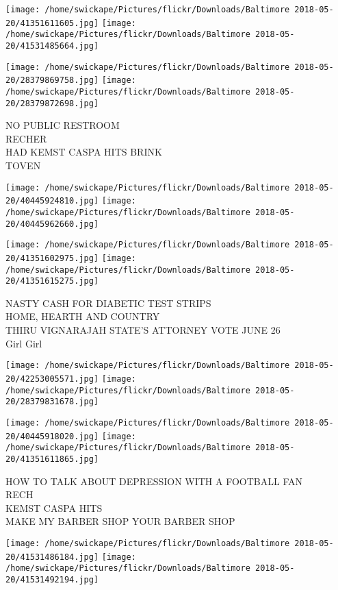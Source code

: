 \documentclass[10pt,letterpaper]{article}
\begin{document}
\texttt{[image: /home/swickape/Pictures/flickr/Downloads/Baltimore 2018-05-20/41351611605.jpg]}
\texttt{[image: /home/swickape/Pictures/flickr/Downloads/Baltimore 2018-05-20/41531485664.jpg]}

\texttt{[image: /home/swickape/Pictures/flickr/Downloads/Baltimore 2018-05-20/28379869758.jpg]}
\texttt{[image: /home/swickape/Pictures/flickr/Downloads/Baltimore 2018-05-20/28379872698.jpg]}

NO PUBLIC RESTROOM\\
RECHER\\
HAD KEMST CASPA HITS BRINK\\
TOVEN
\pagebreak

\texttt{[image: /home/swickape/Pictures/flickr/Downloads/Baltimore 2018-05-20/40445924810.jpg]}
\texttt{[image: /home/swickape/Pictures/flickr/Downloads/Baltimore 2018-05-20/40445962660.jpg]}

\texttt{[image: /home/swickape/Pictures/flickr/Downloads/Baltimore 2018-05-20/41351602975.jpg]}
\texttt{[image: /home/swickape/Pictures/flickr/Downloads/Baltimore 2018-05-20/41351615275.jpg]}

NASTY CASH FOR DIABETIC TEST STRIPS\\
HOME, HEARTH AND COUNTRY\\
THIRU VIGNARAJAH STATE'S ATTORNEY VOTE JUNE 26\\
Girl Girl
\pagebreak

\texttt{[image: /home/swickape/Pictures/flickr/Downloads/Baltimore 2018-05-20/42253005571.jpg]}
\texttt{[image: /home/swickape/Pictures/flickr/Downloads/Baltimore 2018-05-20/28379831678.jpg]}

\texttt{[image: /home/swickape/Pictures/flickr/Downloads/Baltimore 2018-05-20/40445918020.jpg]}
\texttt{[image: /home/swickape/Pictures/flickr/Downloads/Baltimore 2018-05-20/41351611865.jpg]}

HOW TO TALK ABOUT DEPRESSION WITH A FOOTBALL FAN\\
RECH\\
KEMST CASPA HITS\\
MAKE MY BARBER SHOP YOUR BARBER SHOP
\pagebreak

\texttt{[image: /home/swickape/Pictures/flickr/Downloads/Baltimore 2018-05-20/41531486184.jpg]}
\texttt{[image: /home/swickape/Pictures/flickr/Downloads/Baltimore 2018-05-20/41531492194.jpg]}
\end{document}
